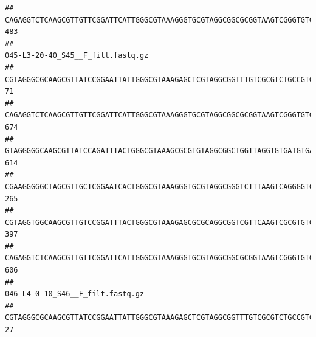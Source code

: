 \documentclass[]{article}
\begin{document}
\begin{verbatim}
## CAGAGGTCTCAAGCGTTGTTCGGATTCATTGGGCGTAAAGGGTGCGTAGGCGGCGCGGTAAGTCGGGTGTGAAATCTCGGGGCTTAACTCCGAAACTGCATTCGATACTGCCGTGCTTGAGGACTGGAGAGGAGACTGGAATTTACGGTGTAGCGGTGAAATGCGTAGATATCGTAAGGAAGACCAGTGGCGAAGGCGGGTCTCTGGACAGTTCCTGACGCTGAGGCACGAAGGCCAGGGGAGCAAACG                               483
##                                                                                                                                                                                                                                                           045-L3-20-40_S45__F_filt.fastq.gz
## CGTAGGGCGCAAGCGTTATCCGGAATTATTGGGCGTAAAGAGCTCGTAGGCGGTTTGTCGCGTCTGCCGTGAAAGTCCGGGGCTCAACTCCGGATCTGCGGTGGGTACGGGCAGACTAGAGTGATGTAGGGGAGACTGGAATTCCTGGTGTAGCGGTGAAATGCGCAGATATCAGGAGGAACACCGATGGCGAAGGCAGGTCTCTGGGCATTAACTGACGCTGAGGAGCGAAAGCATGGGGAGCGAACA                                71
## CAGAGGTCTCAAGCGTTGTTCGGATTCATTGGGCGTAAAGGGTGCGTAGGCGGCGCGGTAAGTCGGGTGTGAAATCTCGGAGCTTAACTCCGAAACTGCATTCGATACTGCCGTGCTTGAGGACTGGAGAGGAGACTGGAATTTACGGTGTAGCGGTGAAATGCGTAGATATCGTAAGGAAGACCAGTGGCGAAGGCGGGTCTCTGGACAGTTCCTGACGCTGAGGCACGAAGGCCAGGGGAGCAAACG                               674
## GTAGGGGGCAAGCGTTATCCAGATTTACTGGGCGTAAAGCGCGTGTAGGCGGCTGGTTAGGTGTGATGTGAAATCTTCCGGCTCAACCGGAAAACTGCATTGCAAACCGGCCTGGCTAGAGTGCAGGAGAGGGAAGCGGAATTCCAGGTGTAGCGGTGAAATGCGTAGATATCTGGAGGAACACCAGTGGCGAAGGCGGCTTCCTGGCCTGCAACTGACGCTGAGACGCGAAAGCGTGGGGAGCGAAC                                614
## CGAAGGGGGCTAGCGTTGCTCGGAATCACTGGGCGTAAAGGGTGCGTAGGCGGGTCTTTAAGTCAGGGGTGAAATCCTGGAGCTCAACTCCAGAACTGCCTTTGATACTGAAGATCTTGAGTTCGGGAGAGGTGAGTGGAACTGCGAGTGTAGAGGTGAAATTCGTAGATATTCGCAAGAACACCAGTGGCGAAGGCGGCTCACTGGCCCGATACTGACGCTGAGGCACGAAAGCGTGGGGAGCAAACA                               265
## CGTAGGTGGCAAGCGTTGTCCGGATTTACTGGGCGTAAAGAGCGCGCAGGCGGTCGTTCAAGTCGCGTGTGAAAGCCCCCGGCTCAACTGGGGAGGGTCACGCGATACTGATCGACTCGAAGGCAGGAGAGGGTAGTGGAATTCCCGGTGTAGTGGTGAAATGCGTAGATATCGGGAGGAACACCAGTGGCGAAGGCGACTACCTGGCCTGTTCTTGACGCTGAGGCGCGAAAGCTAGGGGAGCAAACG                               397
## CAGAGGTCTCAAGCGTTGTTCGGATTCATTGGGCGTAAAGGGTGCGTAGGCGGCGCGGTAAGTCGGGTGTGAAATCTCGGGGCTTAACTCCGAAACTGCATTCGATACTGCCGTGCTTGAGGACTGGAGAGGAGACTGGAATTTACGGTGTAGCGGTGAAATGCGTAGATATCGTAAGGAAGACCAGTGGCGAAGGCGGGTCTCTGGACAGTTCCTGACGCTGAGGCACGAAGGCCAGGGGAGCAAACG                               606
##                                                                                                                                                                                                                                                           046-L4-0-10_S46__F_filt.fastq.gz
## CGTAGGGCGCAAGCGTTATCCGGAATTATTGGGCGTAAAGAGCTCGTAGGCGGTTTGTCGCGTCTGCCGTGAAAGTCCGGGGCTCAACTCCGGATCTGCGGTGGGTACGGGCAGACTAGAGTGATGTAGGGGAGACTGGAATTCCTGGTGTAGCGGTGAAATGCGCAGATATCAGGAGGAACACCGATGGCGAAGGCAGGTCTCTGGGCATTAACTGACGCTGAGGAGCGAAAGCATGGGGAGCGAACA                               27

\end{verbatim}
\end{document}
